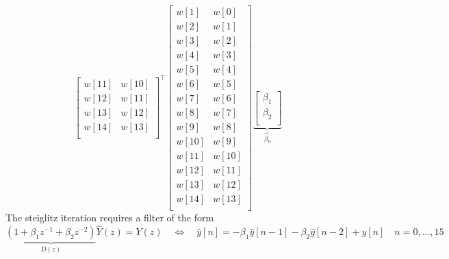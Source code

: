 \documentclass[10pt]{amsart}
\begin{document}
\[\begin{bmatrix}
   w[11] & w[10]   \\
   w[12] & w[11]   \\
   w[13] & w[12]   \\
   w[14] & w[13]   \\
\end{bmatrix}^\top
\begin{bmatrix}
   w[ 1] & w[ 0]   \\
   w[ 2] & w[ 1]   \\
   w[ 3] & w[ 2]   \\
   w[ 4] & w[ 3]   \\
   w[ 5] & w[ 4]   \\
   w[ 6] & w[ 5]   \\
   w[ 7] & w[ 6]   \\
   w[ 8] & w[ 7]   \\
   w[ 9] & w[ 8]   \\
   w[10] & w[ 9]   \\
   w[11] & w[10]   \\
   w[12] & w[11]   \\
   w[13] & w[12]   \\
   w[14] & w[13]   \\
\end{bmatrix}
\underbrace{
\begin{bmatrix}
 \beta_1\\
 \beta_2\\
\end{bmatrix}
}_{\vec{\beta}_0}
\]
The steiglitz iteration requires a filter of the form
\[
             \underbrace{\left(1 + \beta_1 z^{-1} + \beta_2 z^{-2}\right) 
                        }_{D(z)}
                           \hat{Y}(z)
          =   
                                Y (z)
\quad  \Leftrightarrow \quad
	       \hat{y}[n] = - \beta_1 \hat {y}[n-1] - \beta_2 \hat{y}[n-2] + y[n]
  \quad n = 0, \dots, 15
\]
\end{document}

